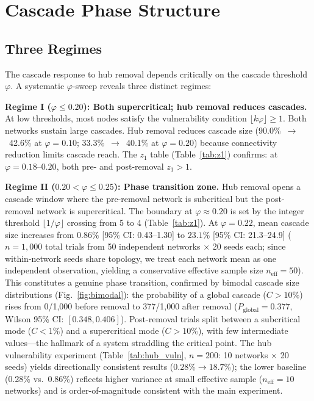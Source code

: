 \documentclass[aps,pre,twocolumn,superscriptaddress,showpacs]{revtex4-2}
\begin{document}
\section{Cascade Phase Structure}
\label{sec:phase}

\subsection{Three Regimes}

The cascade response to hub removal depends critically on the cascade threshold $\varphi$. A systematic $\varphi$-sweep reveals three distinct regimes:

\textbf{Regime I ($\varphi \leq 0.20$): Both supercritical; hub removal reduces cascades.} At low thresholds, most nodes satisfy the vulnerability condition $\lfloor k\varphi \rfloor \geq 1$. Both networks sustain large cascades. Hub removal reduces cascade size (90.0\%~$\to$~42.6\% at $\varphi=0.10$; 33.3\%~$\to$~40.1\% at $\varphi=0.20$) because connectivity reduction limits cascade reach. The $z_1$ table (Table~\ref{tab:z1}) confirms: at $\varphi=0.18$--$0.20$, both pre- and post-removal $z_1 > 1$.

\textbf{Regime II ($0.20 < \varphi \leq 0.25$): Phase transition zone.} Hub removal opens a cascade window where the pre-removal network is subcritical but the post-removal network is supercritical. The boundary at $\varphi \approx 0.20$ is set by the integer threshold $\lfloor 1/\varphi \rfloor$ crossing from 5 to 4 (Table~\ref{tab:z1}). At $\varphi=0.22$, mean cascade size increases from $0.86\%$ [95\% CI: 0.43--1.30] to $23.1\%$ [95\% CI: 21.3--24.9] ($n=1{,}000$ total trials from 50 independent networks $\times$ 20 seeds each; since within-network seeds share topology, we treat each network mean as one independent observation, yielding a conservative effective sample size $n_{\mathrm{eff}}=50$). This constitutes a genuine phase transition, confirmed by bimodal cascade size distributions (Fig.~\ref{fig:bimodal}): the probability of a global cascade ($C > 10\%$) rises from 0/1{,}000 before removal to 377/1{,}000 after removal ($P_{\mathrm{global}}=0.377$, Wilson 95\% CI: $[0.348, 0.406]$). Post-removal trials split between a subcritical mode ($C < 1\%$) and a supercritical mode ($C > 10\%$), with few intermediate values---the hallmark of a system straddling the critical point. The hub vulnerability experiment (Table~\ref{tab:hub_vuln}, $n=200$: 10 networks $\times$ 20 seeds) yields directionally consistent results ($0.28\% \to 18.7\%$); the lower baseline (0.28\% vs.\ 0.86\%) reflects higher variance at small effective sample ($n_{\mathrm{eff}}=10$ networks) and is order-of-magnitude consistent with the main experiment.
\end{document}
